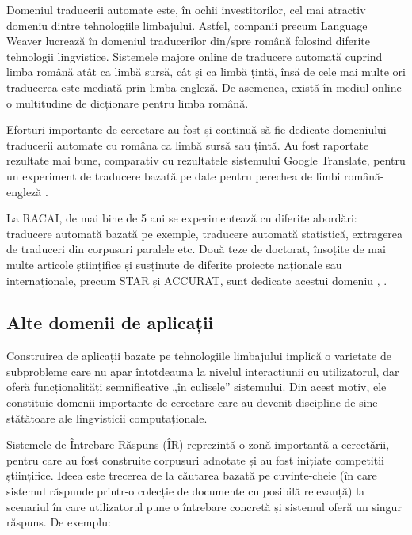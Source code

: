 \begin{multicols}{2}
Domeniul traducerii automate este, în ochii investitorilor, cel mai atractiv domeniu dintre tehnologiile limbajului. Astfel, companii precum Language Weaver lucrează în domeniul traducerilor din/spre română folosind diferite tehnologii lingvistice. Sistemele majore online de traducere automată cuprind limba română atât ca limbă sursă, cât și ca limbă țintă, însă de cele mai multe ori traducerea este mediată prin limba engleză. De asemenea, există în mediul online o multitudine de dicționare pentru limba română.

Eforturi importante de cercetare au fost și continuă să fie dedicate domeniului traducerii automate cu româna ca limbă sursă sau țintă. Au fost raportate rezultate mai bune, comparativ cu rezultatele sistemului Google Translate, pentru un experiment de traducere bazată pe date pentru perechea de limbi română-engleză \cite{munteanu}. 

La RACAI, de mai bine de 5 ani se experimentează cu diferite abordări: traducere automată bazată pe exemple, traducere automată statistică, extragerea de traduceri din corpusuri paralele etc. Două teze de doctorat, însoțite de mai multe articole științifice și susținute de diferite proiecte naționale sau internaționale, precum STAR și ACCURAT, sunt dedicate acestui domeniu \cite{tufisMT}, \cite{irimia}.

\subsection{Alte domenii de aplicații}

Construirea de aplicații bazate pe tehnologiile limbajului implică o varietate de subprobleme care nu apar întotdeauna la nivelul interacțiunii cu utilizatorul, dar oferă funcționalități semnificative „în culisele” sistemului. Din acest motiv, ele constituie domenii importante de cercetare care au devenit discipline de sine stătătoare ale lingvisticii computaționale. 


Sistemele de Întrebare-Răspuns (ÎR) reprezintă o zonă importantă a cercetării, pentru care au fost construite corpusuri adnotate și au fost inițiate competiții științifice. Ideea este trecerea de la căutarea bazată pe cuvinte-cheie (în care sistemul răspunde printr-o colecție de documente cu posibilă relevanță) la scenariul în care utilizatorul pune o întrebare concretă și sistemul oferă un singur răspuns. De exemplu:


\end{multicols}
